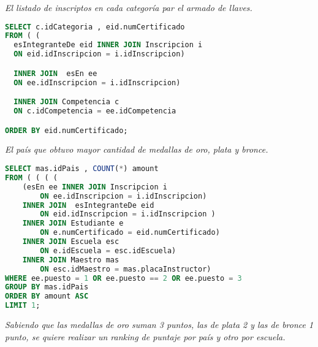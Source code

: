 

\emph{El listado de inscriptos en cada categoría par el armado de llaves.}
\begin{lstlisting}[language=SQL]
SELECT c.idCategoria , eid.numCertificado
FROM ( (
  esIntegranteDe eid INNER JOIN Inscripcion i
  ON eid.idInscripcion = i.idInscripcion)

  INNER JOIN  esEn ee
  ON ee.idInscripcion = i.idInscripcion)

  INNER JOIN Competencia c
  ON c.idCompetencia = ee.idCompetencia

ORDER BY eid.numCertificado;
\end{lstlisting}

\emph{El país que obtuvo mayor cantidad de medallas de oro, plata y bronce.}
\begin{lstlisting}[language=SQL]
SELECT mas.idPais , COUNT(*) amount
FROM ( ( ( (
    (esEn ee INNER JOIN Inscripcion i
        ON ee.idInscripcion = i.idInscripcion)
    INNER JOIN  esIntegranteDe eid
        ON eid.idInscripcion = i.idInscripcion )
    INNER JOIN Estudiante e
        ON e.numCertificado = eid.numCertificado)
    INNER JOIN Escuela esc
        ON e.idEscuela = esc.idEscuela)
    INNER JOIN Maestro mas
        ON esc.idMaestro = mas.placaInstructor)
WHERE ee.puesto = 1 OR ee.puesto == 2 OR ee.puesto = 3
GROUP BY mas.idPais
ORDER BY amount ASC
LIMIT 1;
\end{lstlisting}


\emph{Sabiendo que las medallas de oro suman 3 puntos, las de plata 2 y las de bronce 1 punto, se quiere realizar un ranking de puntaje por país y otro por escuela.}

